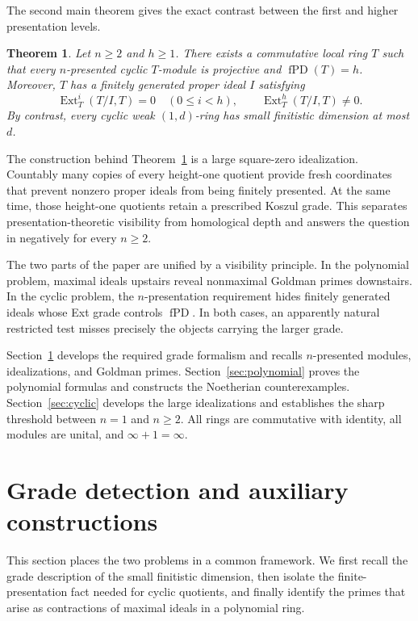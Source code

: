 \documentclass[11pt]{amsart}
\numberwithin{equation}{section}
\newtheorem{theorem}{Theorem}[section]
\theoremstyle{definition}
\theoremstyle{remark}
\newcommand{\fPD}{\operatorname{fPD}}
\newcommand{\Ext}{\operatorname{Ext}}
\begin{document}
The second main theorem gives the exact contrast between the first and higher presentation levels.

\begin{theorem}\label{thm:intro-cyclic}
Let $n\geq2$ and $h\geq1$.  There exists a commutative local ring $T$ such that every $n$-presented cyclic $T$-module is projective and $\fPD(T)=h$.  Moreover, $T$ has a finitely generated proper ideal $I$ satisfying
\[
 \Ext_T^i(T/I,T)=0\quad(0\leq i<h),
 \qquad
 \Ext_T^h(T/I,T)\neq0.
\]
By contrast, every cyclic weak $(1,d)$-ring has small finitistic dimension at most $d$.
\end{theorem}

The construction behind Theorem~\ref{thm:intro-cyclic} is a large square-zero idealization.  Countably many copies of every height-one quotient provide fresh coordinates that prevent nonzero proper ideals from being finitely presented.  At the same time, those height-one quotients retain a prescribed Koszul grade.  This separates presentation-theoretic visibility from homological depth and answers the question in \cite[Open Question~3.8]{ZhangIII} negatively for every $n\geq2$.

The two parts of the paper are unified by a visibility principle.  In the polynomial problem, maximal ideals upstairs reveal nonmaximal Goldman primes downstairs.  In the cyclic problem, the $n$-presentation requirement hides finitely generated ideals whose Ext grade controls $\fPD$.  In both cases, an apparently natural restricted test misses precisely the objects carrying the larger grade.

Section~\ref{sec:preliminaries} develops the required grade formalism and recalls $n$-presented modules, idealizations, and Goldman primes.  Section~\ref{sec:polynomial} proves the polynomial formulas and constructs the Noetherian counterexamples.  Section~\ref{sec:cyclic} develops the large idealizations and establishes the sharp threshold between $n=1$ and $n\geq2$.  All rings are commutative with identity, all modules are unital, and $\infty+1=\infty$.

\section{Grade detection and auxiliary constructions}\label{sec:preliminaries}

This section places the two problems in a common framework.  We first recall the grade description of the small finitistic dimension, then isolate the finite-presentation fact needed for cyclic quotients, and finally identify the primes that arise as contractions of maximal ideals in a polynomial ring.
\end{document}
